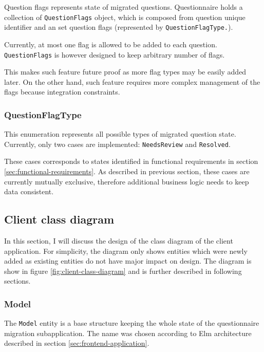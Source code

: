 Question flags represents state of migrated questions.
Questionnaire holds a collection of \texttt{QuestionFlags} object, which is composed from question unique identifier and an set question flags (represented by \texttt{QuestionFlagType.}).

Currently, at most one flag is allowed to be added to each question.
\texttt{QuestionFlags} is however designed to keep arbitrary number of flags.

This makes such feature future proof as more flag types may be easily added later.
On the other hand, such feature requires more complex management of the flags because integration constraints.

\subsubsection*{QuestionFlagType}

This enumeration represents all possible types of migrated question state.
Currently, only two cases are implemented: \texttt{NeedsReview} and \texttt{Resolved}.

These cases corresponds to states identified in functional requirements in section \ref{sec:functional-requirements}.
As described in previous section, these cases are currently mutually exclusive, therefore additional business logic needs to keep data consistent.

\subsection{Client class diagram}

In this section, I will discuss the design of the class diagram of the client application.
For simplicity, the diagram only shows entities which were newly added as existing entities do not have major impact on design.
The diagram is show in figure \ref{fig:client-class-diagram} and is further described in following sections.


\subsubsection*{Model}

The \texttt{Model} entity is a base structure keeping the whole state of the questionnaire migration subapplication.
The name was chosen according to Elm architecture described in section \ref{sec:frontend-application}.

